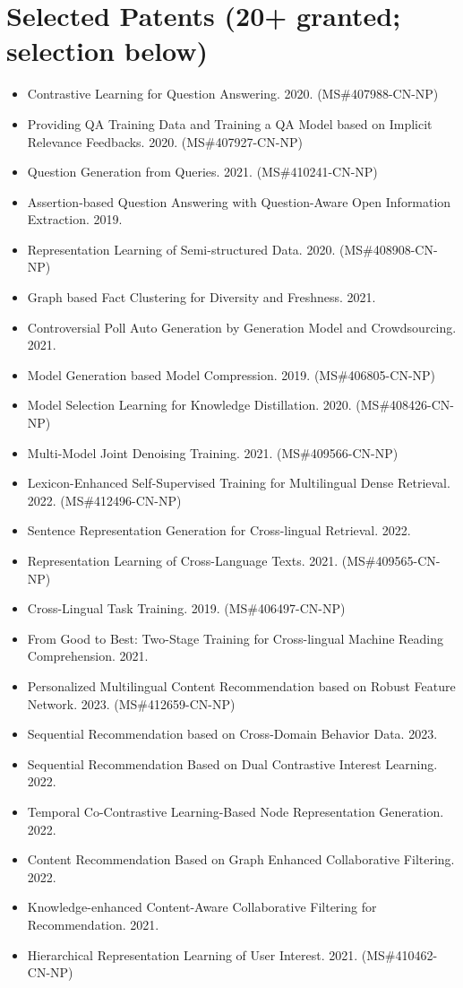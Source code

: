 \documentclass[10.5pt,letterpaper]{article}
\begin{document}
\section*{Selected Patents (20+ granted; selection below)}
\begin{itemize}[leftmargin=1.1em, itemsep=0pt, topsep=1pt, parsep=0pt]
  \item Contrastive Learning for Question Answering. 2020. (MS\#407988-CN-NP)
  \item Providing QA Training Data and Training a QA Model based on Implicit Relevance Feedbacks. 2020. (MS\#407927-CN-NP)
  \item Question Generation from Queries. 2021. (MS\#410241-CN-NP)
  \item Assertion-based Question Answering with Question-Aware Open Information Extraction. 2019.
  \item Representation Learning of Semi-structured Data. 2020. (MS\#408908-CN-NP)
  \item Graph based Fact Clustering for Diversity and Freshness. 2021.
  \item Controversial Poll Auto Generation by Generation Model and Crowdsourcing. 2021.
  \item Model Generation based Model Compression. 2019. (MS\#406805-CN-NP)
  \item Model Selection Learning for Knowledge Distillation. 2020. (MS\#408426-CN-NP)
  \item Multi-Model Joint Denoising Training. 2021. (MS\#409566-CN-NP)
  \item Lexicon-Enhanced Self-Supervised Training for Multilingual Dense Retrieval. 2022. (MS\#412496-CN-NP)
  \item Sentence Representation Generation for Cross-lingual Retrieval. 2022.
  \item Representation Learning of Cross-Language Texts. 2021. (MS\#409565-CN-NP)
  \item Cross-Lingual Task Training. 2019. (MS\#406497-CN-NP)
  \item From Good to Best: Two-Stage Training for Cross-lingual Machine Reading Comprehension. 2021.
  \item Personalized Multilingual Content Recommendation based on Robust Feature Network. 2023. (MS\#412659-CN-NP)
  \item Sequential Recommendation based on Cross-Domain Behavior Data. 2023.
  \item Sequential Recommendation Based on Dual Contrastive Interest Learning. 2022.
  \item Temporal Co-Contrastive Learning-Based Node Representation Generation. 2022.
  \item Content Recommendation Based on Graph Enhanced Collaborative Filtering. 2022.
  \item Knowledge-enhanced Content-Aware Collaborative Filtering for Recommendation. 2021.
  \item Hierarchical Representation Learning of User Interest. 2021. (MS\#410462-CN-NP)
\end{itemize}
\end{document}
